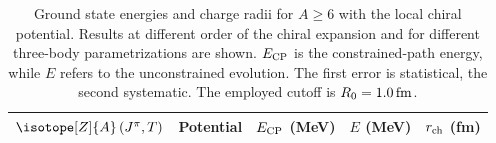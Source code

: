\documentclass[aps,prc,twocolumn,superscriptaddress,showpacs,floatfix,nofootinbib]{revtex4-1}
\begin{document}
\begin{table}[htb]
\centering
\caption[]{Ground state energies and charge radii for $A\ge6$ with the local chiral potential. 
Results at different order of the chiral expansion and for different three-body parametrizations are shown. 
$E_{\rm CP}$ is the constrained-path energy, while $E$ refers to the unconstrained evolution.
The first error is statistical, the second systematic.
The employed cutoff is $R_0=1.0\,\rm fm$.}
\begin{tabular}{llccc}
\hline\hline
$\isotope[Z]{A}\,(J^\pi,T)$ & Potential & $E_{\rm CP}$ (MeV) & $E$ (MeV) & $r_{\rm ch}$ (fm) \\
\hline

\end{tabular}
\end{table}
\end{document}
